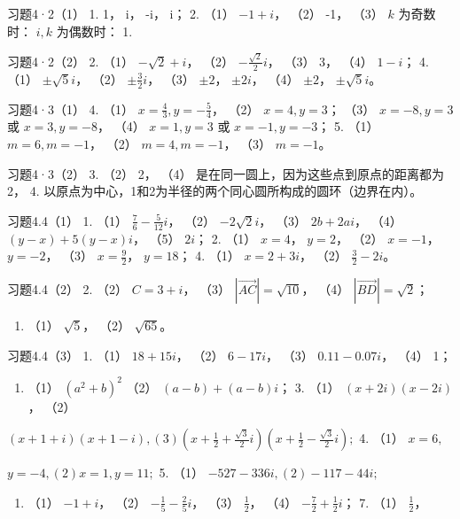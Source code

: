 习题4·2（1） 1. 1， i， -i， i； 2. （1） \(-1 + i\)， （2） -1， （3）
\(k\) 为奇数时： \(i, k\) 为偶数时： 1.

习题4·2（2） 2. （1） \(-\sqrt{2} + i\)， （2）
\(-\frac{\sqrt{2}}{2}i\)， （3） 3， （4） \(1 - i\)； 4. （1）
\(\pm \sqrt{5}i\)， （2） \(\pm \frac{3}{2}i\)， （3） \(\pm 2\)，
\(\pm 2i\)， （4） \(\pm 2\)， \(\pm \sqrt{5}i\)。

习题4·3（1） 4. （1） \(x = \frac{4}{3}, y = -\frac{5}{4}\)， （2）
\(x = 4, y = 3\)； （3） \(x = -8, y = 3\) 或 \(x = 3, y = -8\)， （4）
\(x = 1, y = 3\) 或 \(x = -1, y = -3\)； 5. （1） \(m = 6, m = -1\)，
（2） \(m = 4, m = -1\)， （3） \(m = -1\)。

习题4·3（2） 3. （2） 2， （4）
是在同一圆上，因为这些点到原点的距离都为2， 4.
以原点为中心，1和2为半径的两个同心圆所构成的圆环（边界在内）。

习题4.4（1） 1. （1） \(\frac{7}{6} - \frac{5}{12} i\)， （2）
\(-2\sqrt{2} i\)， （3） \(2b + 2ai\)， （4） \((y - x) + 5(y - x)i\)，
（5） \(2i\)； 2. （1） \(x = 4\)， \(y = 2\)， （2） \(x = -1\)，
\(y = -2\)， （3） \(x = \frac{9}{2}\)， \(y = 18\)； 4. （1）
\(x = 2 + 3i\)， （2） \(\frac{3}{2} - 2i\)。

习题4.4（2） 2. （2） \(C = 3 + i\)， （3）
\(|\overrightarrow{AC}| = \sqrt{10}\)， （4）
\(|\overrightarrow{BD}| = \sqrt{2}\)；

\begin{enumerate}[start=3]
\item
  （1） \(\sqrt{5}\)， （2） \(\sqrt{65}\)。
\end{enumerate}

习题4.4（3） 1. （1） \(18 + 15i\)， （2） \(6 - 17i\)， （3）
\(0.11 - 0.07i\)， （4） 1；

\begin{enumerate}[start=2]
\item
  （1） \((a^2 + b)^2\) （2） \((a - b) + (a - b)i\)； 3. （1）
  \((x + 2i)(x - 2i)\)， （2）
\end{enumerate}

\((x + 1 + i)(x + 1 - i), (3)\left(x + \frac{1}{2} + \frac{\sqrt{3}}{2}i\right)\left(x + \frac{1}{2} - \frac{\sqrt{3}}{2}i\right);\)
4. （1） \(x = 6,\)

\(y = -4, (2) x = 1, y = 11;\) 5. （1） \(-527 - 336i, (2) -117 - 44i;\)

\begin{enumerate}[start=6]
\item
  （1） \(-1 + i\)， （2） \(-\frac{1}{5} - \frac{2}{5}i\)， （3）
  \(\frac{1}{2}\)， （4） \(-\frac{7}{2} + \frac{1}{2}i\)； 7. （1）
  \(\frac{1}{2}\)，
\end{enumerate}

